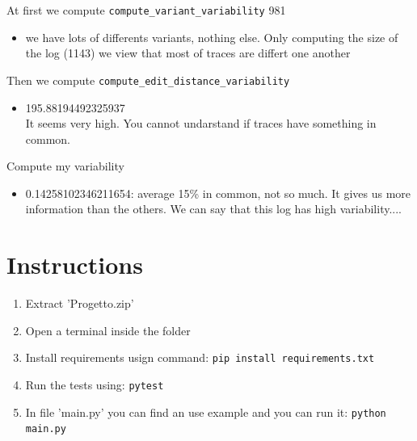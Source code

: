 \documentclass[12pt]{article}
\newcounter{lastnote}
\begin{document}
At first we compute \texttt{compute\_variant\_variability} 981 

\begin{itemize}
	\item we have lots of differents variants, nothing else. Only computing the size of the log (1143) we view that most of traces are differt one another
\end{itemize}

Then we compute \texttt{compute\_edit\_distance\_variability}

\begin{itemize}
	\item 195.88194492325937\\
	It seems very high. You cannot undarstand if traces have something in common.
\end{itemize}

Compute my variability

\begin{itemize}
	\item 0.14258102346211654: average 15\% in common, not so much. It gives us more information than the others. We can say that this log has high variability....
\end{itemize}

\section*{Instructions}

\begin{enumerate}
	\item Extract 'Progetto.zip'
	\item Open a terminal inside the folder
	\item Install requirements usign command: \texttt{pip install requirements.txt}
	\item Run the tests using: \texttt{pytest}
	\item In file 'main.py' you can find an use example and you can run it: \texttt{python main.py}
\end{enumerate}







\end{document}
